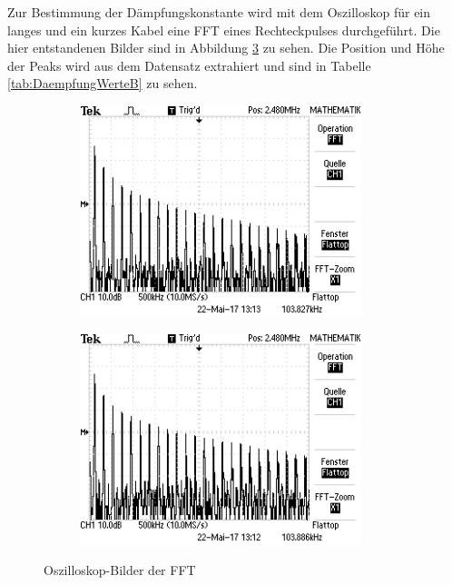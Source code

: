 Zur Bestimmung der Dämpfungskonstante wird mit dem Oszilloskop für ein langes und ein kurzes Kabel eine FFT eines Rechteckpulses durchgeführt. Die hier entstandenen Bilder sind in Abbildung \ref{fig:FFT} zu sehen. Die Position und Höhe der Peaks wird aus dem Datensatz extrahiert und sind in Tabelle \ref{tab:DaempfungWerteB} zu sehen.
\begin{figure}[h]
	\centering
	\begin{subfigure}{0.495\textwidth}
		\centering
		\includegraphics[width=0.9\textwidth]{Oszilloskop/DaempfungLang/F0042TEK.JPG}
		\label{fig:FFTLang}
	\end{subfigure}
	\begin{subfigure}{0.495\textwidth}
		\centering
		\includegraphics[width=0.9\textwidth]{Oszilloskop/DaempfungKurz/F0041TEK.JPG}
		\label{fig:FFTKurz}
	\end{subfigure}
	\caption{Oszilloskop-Bilder der FFT}
	\label{fig:FFT}
\end{figure} \\

